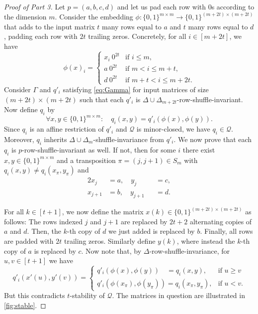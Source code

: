 \documentclass{article}
\begin{document}
\begin{proof}[Proof of Part 3]
    Let $p = (a, b, c, d)$ and let us pad each row with $0$s according to the dimension $m$. Consider the embedding $\phi\colon \{0,1\}^{m\times m} \to \{0,1\}^{(m+2t)\times (m+2t)}$ that adds to the input matrix $t$ many rows equal to $a$ and $t$ many rows equal to $d$, padding each row with $2t$ trailing zeros. Concretely, for all $i\in [m+2t]$, we have
    \[
        \phi(x)_i = \begin{cases}
            x_i\ 0^{2t}&\text{if } i \leq m,\\
            a\ 0^{2t}&\text{if } m < i \leq m+t,\\
            d\ 0^{2t}&\text{if } m+t < i \leq m+2t.
        \end{cases}
    \]
    Consider $\Gamma$ and $q'_i$ satisfying \cref{eq:Gamma} for input matrices of size $(m+2t)\times (m+2t)$ such that each $q'_i$ is $\Delta \cup \Delta_{m + 2t}$-row-shuffle-invariant.
    Now define $q_i$ by
    \[
        \forall x,y\in\{0,1\}^{m\times m}:\quad
        q_i(x,y) = q'_i(\phi(x),\phi(y)).
    \]
    Since $q_i$ is an affine restriction of $q'_i$ and $\mathcal{Q}$ is minor-closed, we have $q_i\in \mathcal{Q}$. Moreover, $q_i$ inherits $\Delta \cup \Delta_m$-shuffle-invariance from $q'_i$.
    We now prove that each $q_i$ is $p$-row-shuffle-invariant as well. If not, then for some $i$ there exist $x,y\in\{0,1\}^{m\times m}$ and a transposition $\pi = (j,j+1) \in S_m$ with $q_i(x,y) \neq q_i(x_\pi,y_\pi)$ and
    \begin{alignat*}{2}
        x_j &= a,\quad y_j &&= c,\\
        x_{j+1} &= b,\quad y_{j+1} &&= d.
    \end{alignat*}
    
    For all $k\in [t+1]$, we now define the matrix
    $x(k)\in\{0,1\}^{(m+2t)\times (m+2t)}$ as follows: The rows indexed $j$ and $j+1$ are replaced by $2t+2$ alternating copies of $a$ and $d$. Then, the $k$-th copy of $d$ we just added is replaced by $b$. Finally, all rows are padded with $2t$ trailing zeros. Similarly define $y(k)$, where instead the $k$-th copy of $a$ is replaced by $c$. Now note that, by $\Delta$-row-shuffle-invariance, for $u,v\in [t+1]$ we have
    \[
        q'_i(x'(u),y'(v)) = \begin{cases}
            q'_i(\phi(x),\phi(y)) \quad = q_i(x,y) ,&\text{if } u \geq v\\
            q'_i(\phi(x_\pi),\phi(y_\pi)) = q_i(x_\pi,y_\pi),&\text{if } u < v.
        \end{cases}
    \]
    But this contradicts $t$-stability of $\mathcal{Q}$. The matrices in question are illustrated in \cref{fig:stable}.
\end{proof}
\end{document}
